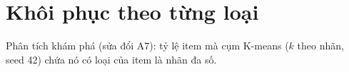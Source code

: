 \section{Khôi phục theo từng loại}\label{app:categories}
Phân tích khám phá (sửa đổi A7): tỷ lệ item mà cụm K-means ($k$ theo nhãn, seed 42) chứa nó có loại của item là nhãn đa số.

\begin{table}[H]
\centering
\caption{Khôi phục theo loại trên bản sửa thật (cohort đầy đủ).}\label{tab:cat-real}
\small
{}
\end{table}

\begin{table}[H]
\centering
\caption{Khôi phục theo loại trên mutant tiêm lỗi (cohort kiểm tra).}\label{tab:cat-injected}
\small
{}
\end{table}
